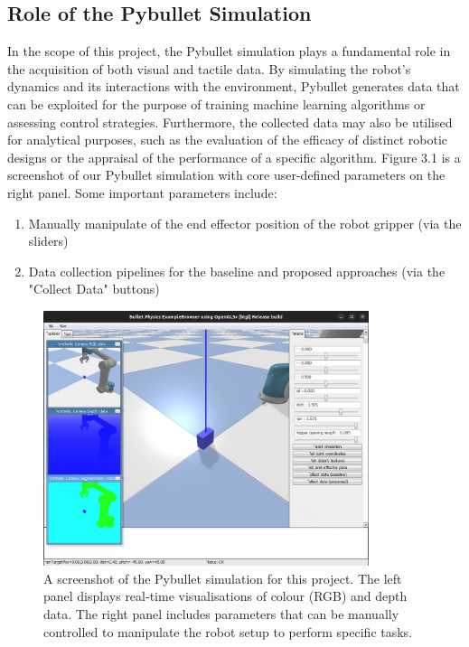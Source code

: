 \documentclass[11pt, a4paper]{report}
\begin{document}
\subsection{Role of the Pybullet Simulation}\label{sec:3.1.1}
In the scope of this project, the Pybullet simulation plays a fundamental role in the acquisition of both visual and tactile data. By simulating the robot's dynamics and its interactions with the environment, Pybullet generates data that can be exploited for the purpose of training machine learning algorithms or assessing control strategies. Furthermore, the collected data may also be utilised for analytical purposes, such as the evaluation of the efficacy of distinct robotic designs or the appraisal of the performance of a specific algorithm. Figure 3.1 is a screenshot of our Pybullet simulation with core user-defined parameters on the right panel. Some important parameters include:
\begin{enumerate}[\itemsep=0em]
    \item Manually manipulate of the end effector position of the robot gripper (via the sliders)
    \item Data collection pipelines for the baseline and proposed approaches (via the "Collect Data" buttons)
\end{enumerate}

\begin{figure}[H]
    \centering
    \includegraphics[width=0.85\textwidth]{docs/Project Report/Media/3_1_1_pybullet_sim.png}
    \caption{A screenshot of the Pybullet simulation for this project. The left panel displays real-time visualisations of colour (RGB) and depth data. The right panel includes parameters that can be manually controlled to manipulate the robot setup to perform specific tasks.}
    \label{fig:3.2}
\end{figure}
\end{document}

